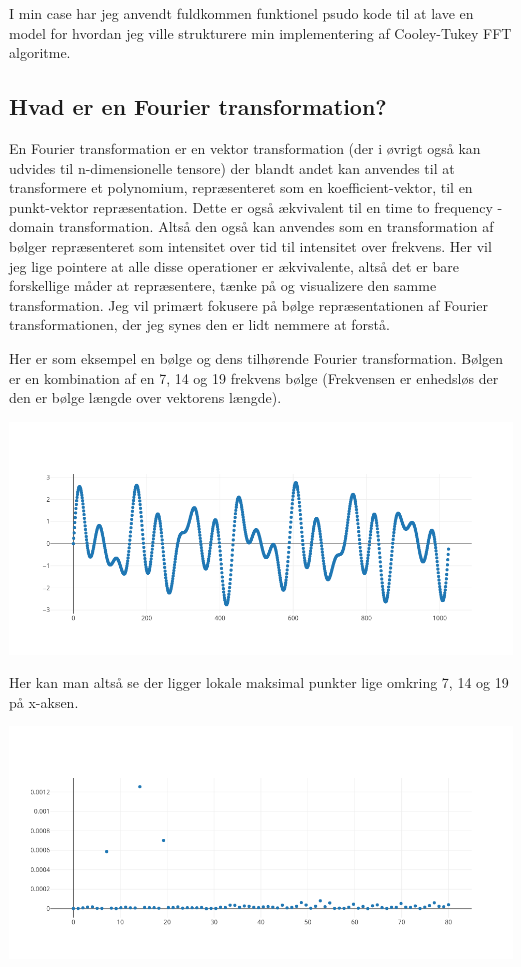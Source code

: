 \documentclass[11pt,a4paper]{article}
\begin{document}
I min case har jeg anvendt fuldkommen funktionel psudo kode til at lave en model
for hvordan jeg ville strukturere min implementering af Cooley-Tukey FFT algoritme.

\subsection{Hvad er en Fourier transformation?}
\label{sec:org8d810de}
\newpage

En Fourier transformation er en vektor transformation (der i øvrigt også kan udvides til n-dimensionelle tensore)
der blandt andet kan anvendes til at transformere et polynomium,
repræsenteret som en koefficient-vektor, til en punkt-vektor repræsentation.
Dette er også ækvivalent til en time to frequency -domain transformation.
Altså den også kan anvendes som en transformation af bølger repræsenteret som intensitet over tid til intensitet over frekvens.
Her vil jeg lige pointere at alle disse operationer er ækvivalente, altså det er bare forskellige måder at repræsentere, tænke på og visualizere den samme transformation.
Jeg vil primært fokusere på bølge repræsentationen af Fourier transformationen, der jeg synes den er lidt nemmere at forstå.

Her er som eksempel en bølge og dens tilhørende Fourier transformation.
Bølgen er en kombination af en 7, 14 og 19 frekvens bølge (Frekvensen er enhedsløs der den er bølge længde over vektorens længde).

\begin{center}
\includegraphics[width=.9\linewidth]{./source_plot2.png}
\end{center}

Her kan man altså se der ligger lokale maksimal punkter lige omkring 7, 14 og 19 på x-aksen.
\begin{center}
\includegraphics[width=.9\linewidth]{./plot2.png}
\end{center}
\end{document}
